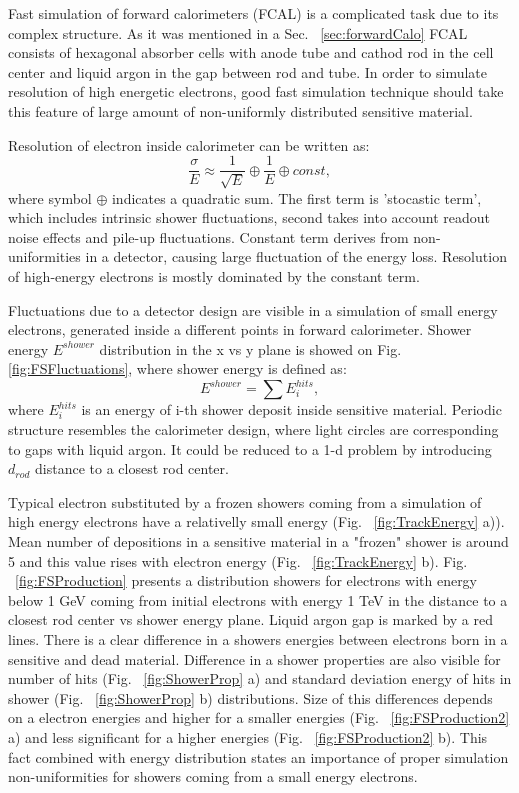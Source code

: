 Fast simulation of forward calorimeters (FCAL) is a complicated task due to its complex structure. As it was mentioned in a Sec. ~\ref{sec:forwardCalo} FCAL consists of hexagonal absorber cells with anode tube and cathod rod in the cell center and liquid argon in the gap between rod and tube. In order to simulate resolution of high energetic electrons, good fast simulation technique should take this feature of large amount of non-uniformly distributed sensitive material.

Resolution of electron inside calorimeter can be written as:
\begin{equation}\label{eq:EMResoultion}
\frac{\sigma}{E} \approx \frac{1}{\sqrt{E}}	\oplus \frac{1}{E} 	\oplus const,
\end{equation}
where symbol $\oplus$ indicates a quadratic sum. The first term is 'stocastic term', which includes intrinsic shower fluctuations, second takes into account readout noise effects and pile-up fluctuations. Constant term derives from non-uniformities in a detector, causing large fluctuation of the energy loss. Resolution of high-energy electrons is mostly dominated by the constant term. 

Fluctuations due to a detector design are visible in a simulation of small energy electrons, generated inside a different points in forward calorimeter. Shower energy $E^{shower}$ distribution in the x vs y plane is showed on Fig. \ref{fig:FSFluctuations}, where shower energy is defined as:
\begin{equation}
E^{shower}=\sum E_i^{hits},
\end{equation}
where $E_i^{hits}$ is an energy of i-th shower deposit inside sensitive material. Periodic structure resembles the calorimeter design, where light circles are corresponding to gaps with liquid argon. It could be reduced to a 1-d problem by introducing $d_{rod}$ distance to a closest rod center. 

Typical electron substituted by a frozen showers coming from a simulation of high energy electrons have a relativelly small energy (Fig. ~\ref{fig:TrackEnergy} a)). Mean number of depositions in a sensitive material in a "frozen" shower is around 5 and this value rises with electron energy (Fig. ~\ref{fig:TrackEnergy} b).  Fig. ~\ref{fig:FSProduction} presents a distribution showers for electrons with energy below 1 GeV coming from initial electrons with energy 1 TeV in the distance to a closest rod center vs shower energy plane. Liquid argon gap is marked by a red lines. There is a clear difference in a showers energies between electrons born in a sensitive and dead material. Difference in a shower properties are also visible for number of hits  (Fig. ~\ref{fig:ShowerProp} a) and standard deviation energy of hits in shower (Fig. ~\ref{fig:ShowerProp} b) distributions. Size of this differences depends on a electron energies and higher for a smaller energies (Fig. ~\ref{fig:FSProduction2} a) and less significant for a higher energies (Fig. ~\ref{fig:FSProduction2} b).  This fact combined with energy distribution states an importance of proper simulation non-uniformities for showers coming from a small energy electrons.

